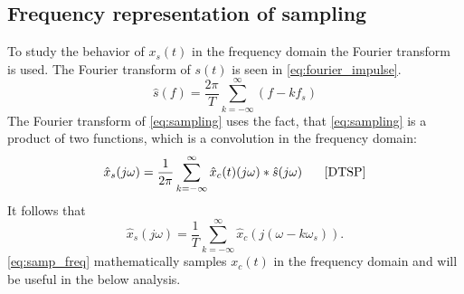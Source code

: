 \subsection{Frequency representation of sampling}
To study the behavior of $x_s(t)$ in the frequency domain the Fourier transform is used. The Fourier transform of $s(t)$ is seen in \eqref{eq:fourier_impulse}.
\begin{equation}\label{eq:fourier_impulse}
\hat{s}(f)=\frac{2\pi}{T}\sum_{k=-\infty}^{\infty}(f-kf_s)
\end{equation}
The Fourier transform of \eqref{eq:sampling} uses the fact, that \eqref{eq:sampling} is a product of two functions, which is a convolution in the frequency domain:
\begin{equation}
\hat{x}_s(j\omega)=\frac{1}{2\pi}\sum_{k=-\infty}^{\infty}\hat{x}_c(t)(j\omega)*\hat{s}(j\omega)\phantom{mm}\text{\cite{DTSP}}
\end{equation}
It follows that
\begin{equation}\label{eq:samp_freq}
\hat{x}_s(j\omega)=\frac{1}{T}\sum_{k=-\infty}^{\infty}\hat{x}_c(j(\omega-k\omega_s)).
\end{equation}
\eqref{eq:samp_freq} mathematically samples $x_c(t)$ in the frequency domain and will be useful in the below analysis.
